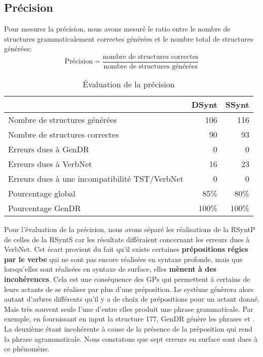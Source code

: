 \subsection{Précision}
Pour mesurer la précision, nous avons mesuré le ratio entre le nombre de structures grammaticalement correctes générées et le nombre total de structures générées:
\[\text{Précision} = \frac{\text{nombre de structures correctes}}{\text{nombre de structures générées}}\]

\begin{table}
\caption{Évaluation de la précision}
\begin{tabular}{lrr}
 \toprule
  & DSynt & SSynt\\
 \midrule
 Nombre de structures générées   & 106  & 116 \\
 Nombre de structures correctes  &  90  & 93   \\
 Erreurs dues à GenDR & 0 & 0\\
 Erreurs dues à VerbNet    & 16 & 23\\
 Erreurs dues à une incompatibilité TST/VerbNet & 0 & 0\\
 \midrule
 Pourcentage global & 85\%  & 80\% \\
 Pourcentage GenDR & 100\%  & 100\% \\
 \bottomrule
\end{tabular}
\end{table}

Pour l'évaluation de la précision, nous avons séparé les réalisations de la \ac{RSyntP} de celles de la \ac{RSyntS} car les résultats différaient concernant les erreurs dues à VerbNet. Cet écart provient du fait qu'il existe certaines \textbf{prépositions régies par le verbe} qui ne sont pas encore réalisées en syntaxe profonde, mais que lorsqu'elles sont réalisées en syntaxe de surface, elles \textbf{mènent à des incohérences}. Cela est une conséquence des \acp{GP} qui permettent à certains de leurs actants de se réaliser par plus d'une préposition. Le système génèrera alors autant d'arbres différents qu'il y a de choix de prépositions pour un actant donné. Mais très souvent seule l'une d'entre elles produit une phrase grammaticale. Par exemple, en fournissant en input la structure 177, GenDR génère les phrases  et \ungr{}. La deuxième étant incohérente à cause de la présence de la préposition  qui rend la phrase agrammaticale. Nous constatons que sept erreurs en surface sont dues à ce phénomène.

